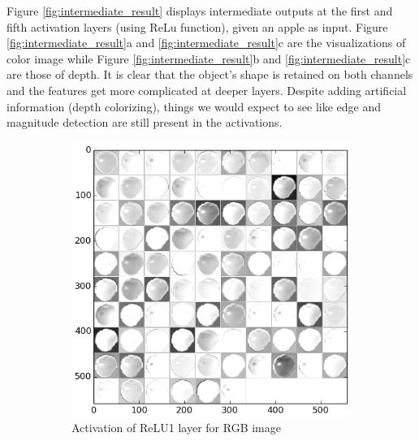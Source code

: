 Figure \ref{fig:intermediate_result} displays intermediate outputs at the first and fifth activation layers (using ReLu function), given an apple as input. Figure \ref{fig:intermediate_result}a and \ref{fig:intermediate_result}c are the visualizations of color image while Figure \ref{fig:intermediate_result}b and \ref{fig:intermediate_result}c are those of depth. It is clear that the object's shape is retained on both channels and the features get more complicated at deeper layers. Despite adding artificial information (depth colorizing), things we would expect to see like edge and magnitude detection are still present in the activations.

\begin{figure}
	\centering
	\begin{subfigure}[b]{0.45\linewidth}
		\includegraphics[width=\textwidth]{img/relu1_rgb.png}
		\caption{Activation of ReLU1 layer for RGB image}
	\end{subfigure}   	
	\begin{subfigure}[b]{0.45\linewidth}

\end{subfigure}
\end{figure}
